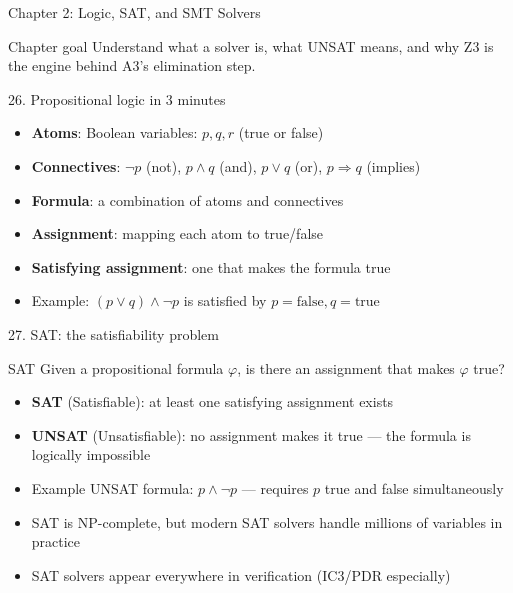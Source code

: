 \documentclass[aspectratio=169]{beamer}
\begin{document}

\begin{frame}{Chapter 2: Logic, SAT, and SMT Solvers}
\begin{block}{Chapter goal}
Understand what a solver is, what UNSAT means, and why Z3 is the engine behind A3's elimination step.
\end{block}
\end{frame}

\begin{frame}{26. Propositional logic in 3 minutes}
\begin{itemize}
  \item \textbf{Atoms}: Boolean variables: \(p, q, r\) (true or false)
  \item \textbf{Connectives}: \(\neg p\) (not), \(p \wedge q\) (and), \(p \vee q\) (or), \(p \Rightarrow q\) (implies)
  \item \textbf{Formula}: a combination of atoms and connectives
  \item \textbf{Assignment}: mapping each atom to true/false
  \item \textbf{Satisfying assignment}: one that makes the formula true
  \item Example: \((p \vee q) \wedge \neg p\) is satisfied by \(p=\text{false}, q=\text{true}\)
\end{itemize}
\end{frame}

\begin{frame}{27. SAT: the satisfiability problem}
\begin{block}{SAT}
Given a propositional formula \(\varphi\), is there an assignment that makes \(\varphi\) true?
\end{block}
\begin{itemize}
  \item \textbf{SAT} (Satisfiable): at least one satisfying assignment exists
  \item \textbf{UNSAT} (Unsatisfiable): no assignment makes it true --- the formula is logically impossible
  \item Example UNSAT formula: \(p \wedge \neg p\) --- requires \(p\) true and false simultaneously
  \item SAT is NP-complete, but modern SAT solvers handle millions of variables in practice
  \item SAT solvers appear everywhere in verification (IC3/PDR especially)
\end{itemize}
\end{frame}
\end{document}
